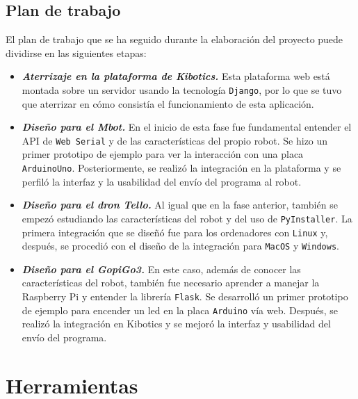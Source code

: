 \documentclass{report}
\begin{document}
\section{Plan de trabajo}

El plan de trabajo que se ha seguido durante la elaboración del proyecto puede dividirse en las siguientes etapas:
\begin{itemize}
	\item \textit{\textbf{Aterrizaje en la plataforma de Kibotics.}} Esta plataforma web está montada sobre un servidor usando la tecnología \texttt{Django}, por lo que se tuvo que aterrizar en cómo consistía el funcionamiento de esta aplicación.
	\item \textit{\textbf{Diseño para el Mbot.}} En el inicio de esta fase fue fundamental entender el API de \texttt{Web Serial} y de las características del propio robot. Se hizo un primer prototipo de ejemplo para ver la interacción con una placa \texttt{ArduinoUno}. Posteriormente, se realizó la integración en la plataforma y se perfiló la interfaz y la usabilidad del envío del programa al robot.
	\item \textit{\textbf{Diseño para el dron Tello.}} Al igual que en la fase anterior, también se empezó estudiando las características del robot y del uso de \texttt{PyInstaller}. La primera integración que se diseñó fue para los ordenadores con \texttt{Linux} y, después, se procedió con el diseño de la integración para \texttt{MacOS} y \texttt{Windows}.
	\item \textit{\textbf{Diseño para el GopiGo3.}} En este caso, además de conocer las características del robot, también fue necesario aprender a manejar la Raspberry Pi y entender la librería \texttt{Flask}. Se desarrolló un primer prototipo de ejemplo para encender un led en la placa \texttt{Arduino} vía web. Después, se realizó la integración en Kibotics y se mejoró la interfaz y usabilidad del envío del programa.
	
\end{itemize}






\chapter{Herramientas}
\end{document}
